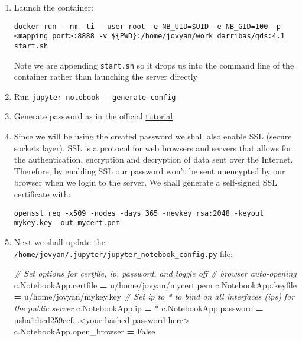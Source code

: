 \documentclass[
]{book}
\newenvironment{Shaded}{\begin{snugshade}}{\end{snugshade}}
\newcommand{\CommentTok}[1]{\textcolor[rgb]{0.56,0.35,0.01}{\textit{#1}}}
\newcommand{\NormalTok}[1]{#1}
\newcommand{\OperatorTok}[1]{\textcolor[rgb]{0.81,0.36,0.00}{\textbf{#1}}}
\newcommand{\StringTok}[1]{\textcolor[rgb]{0.31,0.60,0.02}{#1}}
\newcommand{\VariableTok}[1]{\textcolor[rgb]{0.00,0.00,0.00}{#1}}
\begin{document}
\begin{enumerate}
\def\labelenumi{\arabic{enumi}.}
\item
  Launch the container:

\begin{verbatim}
docker run --rm -ti --user root -e NB_UID=$UID -e NB_GID=100 -p <mapping_port>:8888 -v ${PWD}:/home/jovyan/work darribas/gds:4.1 start.sh  
\end{verbatim}

  Note we are appending \texttt{start.sh} so it drops us into
  the command line of the container rather than launching the server directly
\item
  Run \texttt{jupyter\ notebook\ -\/-generate-config}
\item
  Generate password as in the official \href{http://jupyter-notebook.readthedocs.io/en/stable/public_server.html\#preparing-a-hashed-password}{tutorial}
\item
  Since we will be using the created password we shall also enable SSL (secure sockets layer). SSL is a protocol for web browsers and servers that allows for the authentication, encryption and decryption of data sent over the Internet. Therefore, by enabling SSL our password won't be sent unencypted by our browser when we login to the server. We shall generate a self-signed SSL certificate with:

\begin{verbatim}
openssl req -x509 -nodes -days 365 -newkey rsa:2048 -keyout mykey.key -out mycert.pem
\end{verbatim}
\item
  Next we shall update the \texttt{/home/jovyan/.jupyter/jupyter\_notebook\_config.py} file:

\begin{Shaded}
\begin{Highlighting}[]
\CommentTok{\# Set options for certfile, ip, password, and toggle off}
\CommentTok{\# browser auto{-}opening}
\NormalTok{c.NotebookApp.certfile }\OperatorTok{=} \StringTok{u\textquotesingle{}/home/jovyan/mycert.pem\textquotesingle{}}
\NormalTok{c.NotebookApp.keyfile }\OperatorTok{=} \StringTok{u\textquotesingle{}/home/jovyan/mykey.key\textquotesingle{}}
\CommentTok{\# Set ip to \textquotesingle{}*\textquotesingle{} to bind on all interfaces (ips) for the public server}
\NormalTok{c.NotebookApp.ip }\OperatorTok{=} \StringTok{\textquotesingle{}*\textquotesingle{}}
\NormalTok{c.NotebookApp.password }\OperatorTok{=} \StringTok{u\textquotesingle{}sha1:bcd259ccf...\textless{}your hashed password here\textgreater{}\textquotesingle{}}
\NormalTok{c.NotebookApp.open\_browser }\OperatorTok{=} \VariableTok{False}


\end{Highlighting}
\end{Shaded}
\end{enumerate}
\end{document}
